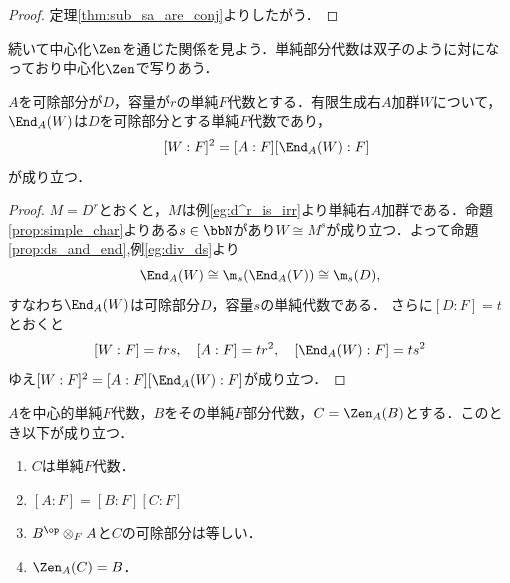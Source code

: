 \documentclass[a4paper,11pt]{jsarticle}
\begin{document}
\begin{proof}
  定理\ref{thm:sub_sa_are_conj}よりしたがう．
\end{proof}
続いて中心化$\Zen$を通じた関係を見よう．単純部分代数は双子のように対になっており中心化$\Zen$で写りあう．
\begin{lem}[SA上有限生成加群の自己同型群]\label{lem:fg_sa_mod}
  $A$を可除部分が$D$，容量が$r$の単純$F$代数とする．有限生成右$A$加群$W$について，$\End_A(W)$は$D$を可除部分とする単純$F$代数であり，
  \[
    \quad [W:F]^2=[A:F][\End_A(W):F]
  \]
  が成り立つ．
\end{lem}
\begin{proof}
  $M=D^r$とおくと，$M$は例\ref{eg:d^r_is_irr}より単純右$A$加群である．命題\ref{prop:simple_char}よりある$s\in\bbN$があり$W\cong M^s$が成り立つ．よって命題\ref{prop:ds_and_end},例\ref{eg:div_ds}より
  \[
    \End_A(W)\cong \m_s(\End_A(V))\cong\m_s(D),
  \]
  すなわち$\End_A(W)$は可除部分$D$，容量$s$の単純代数である．
  さらに$[D:F]=t$とおくと
  \[
    [W:F]=trs,\quad [A:F]=tr^2,\quad [\End_A(W):F]=ts^2
  \]
  ゆえ$[W:F]^2=[A:F][\End_A(W):F]$が成り立つ．
\end{proof}
\begin{thm}[CSAの部分SAの中心化代数]\label{thm:centraliser_of_simple_subalg}
  $A$を中心的単純$F$代数，$B$をその単純$F$部分代数，$C=\Zen_A(B)$とする．このとき以下が成り立つ．
  \begin{enumerate}
    \item $C$は単純$F$代数．
    \item $[A:F]=[B:F][C:F]$
    \item $B^{\op}\otimes_F A$と$C$の可除部分は等しい．
    \item $\Zen_A(C)=B$．
  \end{enumerate}
\end{thm}
\end{document}
